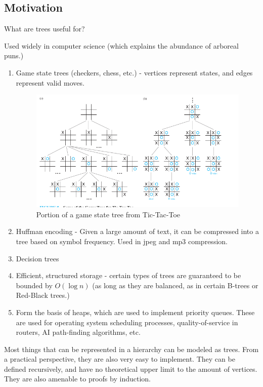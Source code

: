 \documentclass[a4paper,10pt]{report}
\begin{document}
\subsection{Motivation}
What are trees useful for?

Used widely in computer science (which explains the abundance of arboreal puns.)
\begin{enumerate}
	\item Game state trees (checkers, chess, etc.) - vertices represent states, and edges represent valid moves.
	\begin{figure}[h!]
	\begin{centering}
	\begin{center}
	\includegraphics[width=\linewidth]{./game_states.png}
	\caption{Portion of a game state tree from Tic-Tac-Toe}
	\label{fig:game_state}
	\end{center}
	\par\end{centering}
\end{figure}
	\item Huffman encoding - Given a large amount of text, it can be compressed into a tree based on symbol frequency. Used in jpeg and mp3 compression.
	\item Decision trees
	\item Efficient, structured storage - certain types of trees are guaranteed to be bounded by $O(\log n)$ (as long as they are balanced, as in certain B-trees or Red-Black trees.)
	\item Form the basis of heaps, which are used to implement priority queues. These are used for operating system scheduling processes, quality-of-service in routers, AI path-finding algorithms, etc.
\end{enumerate}
Most things that can be represented in a hierarchy can be modeled as trees. From a practical perspective, they are also very easy to implement. They can be defined recursively, and have no theoretical upper limit to the amount of vertices. They are also amenable to proofs by induction.
\end{document}
